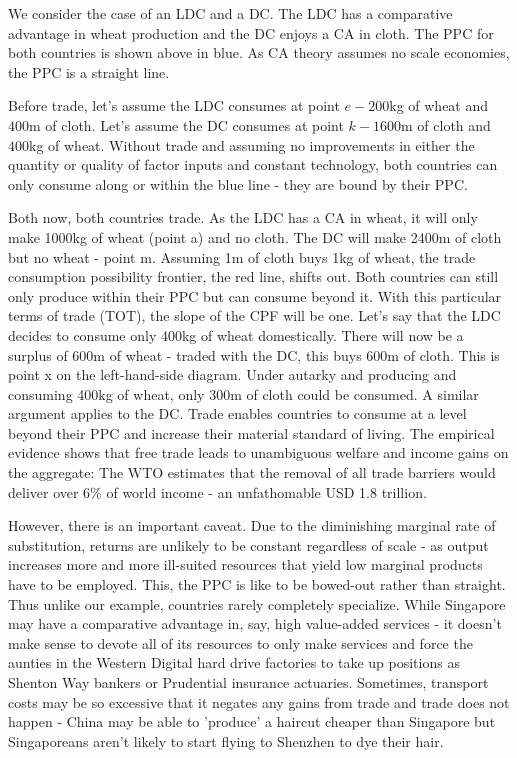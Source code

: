 We consider the case of an LDC and a DC. The LDC has a comparative advantage in wheat production and the DC enjoys a CA in cloth. The PPC for both countries is shown above in blue. As CA theory assumes no scale economies, the PPC is a straight line.

Before trade, let's assume the LDC consumes at point $e - 200$kg of wheat and $400$m of cloth. Let's assume the DC consumes at point $k - 1600$m of cloth and $400$kg of wheat. Without trade and assuming no improvements in either the quantity or quality of factor inputs and constant technology, both countries can only consume along or within the blue line - they are bound by their PPC.

Both now, both countries trade. As the LDC has a CA in wheat, it will only make 1000kg of wheat (point a) and no cloth. The DC will make 2400m of cloth but no wheat - point m. Assuming 1m of cloth buys 1kg of wheat, the trade consumption possibility frontier, the red line, shifts out. Both countries can still only produce within their PPC but can consume beyond it. With this particular terms of trade (TOT), the slope of the CPF will be one. Let's say that the LDC decides to consume only 400kg of wheat domestically. There will now be a surplus of 600m of wheat - traded with the DC, this buys 600m of cloth. This is point x on the left-hand-side diagram. Under autarky and producing and consuming 400kg of wheat, only 300m of cloth could be consumed. A similar argument applies to the DC. Trade enables countries to consume at a level beyond their PPC and increase their material standard of living. The empirical evidence shows that free trade leads to unambiguous welfare and income gains on the aggregate: The WTO estimates that the removal of all trade barriers would deliver over 6\% of world income - an unfathomable USD 1.8 trillion.

However, there is an important caveat. Due to the diminishing marginal rate of substitution, returns are unlikely to be constant regardless of scale - as output increases more and more ill-suited resources that yield low marginal products have to be employed. This, the PPC is like to be bowed-out rather than straight. Thus unlike our example, countries rarely completely specialize. While Singapore may have a comparative advantage in, say, high value-added services - it doesn't make sense to devote all of its resources to only make services and force the aunties in the Western Digital hard drive factories to take up positions as Shenton Way bankers or Prudential insurance actuaries. Sometimes, transport costs may be so excessive that it negates any gains from trade and trade does not happen - China may be able to 'produce' a haircut cheaper than Singapore but Singaporeans aren't likely to start flying to Shenzhen to dye their hair.
